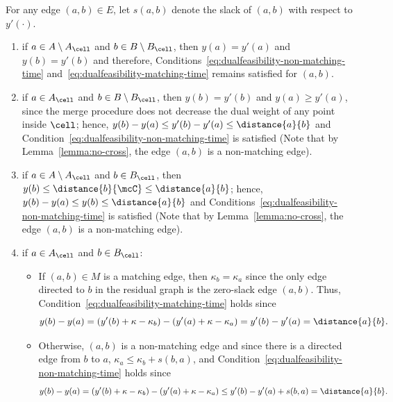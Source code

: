      For any edge $(a,b)\in E$, let $s(a,b)$ denote the slack of $(a,b)$ with respect to $y'(\cdot)$. 
    \begin{enumerate}
        \item if $a\in A\setminus A_\cell$ and $b\in B\setminus B_\cell$, then $y(a)=y'(a)$ and $y(b)=y'(b)$ and therefore, Conditions~\eqref{eq:dualfeasibility-non-matching-time} and~\eqref{eq:dualfeasibility-matching-time} remains satisfied for $(a,b)$.
        
        \item if $a\in A_\cell$ and $b\in B\setminus B_\cell$, then $y(b)=y'(b)$ and $y(a)\ge y'(a)$, since the merge procedure does not decrease the dual weight of any point inside $\cell$; hence, $y(b)-y(a)\le y'(b)-y'(a)\le \distance{a}{b}$ and Condition~\eqref{eq:dualfeasibility-non-matching-time} is satisfied (Note that by Lemma~\ref{lemma:no-cross}, the edge $(a,b)$ is a non-matching edge).

        \item if $a\in A\setminus A_\cell$ and $b\in B_\cell$, then $y(b)\le \distance{b}{\mcC}\le \distance{a}{b}$; hence, $y(b)-y(a)\le y(b)\le \distance{a}{b}$ and Conditions~\eqref{eq:dualfeasibility-non-matching-time} is satisfied (Note that by Lemma~\ref{lemma:no-cross}, the edge $(a,b)$ is a non-matching edge).

        \item if $a\in  A_\cell$ and $b\in B_\cell$: 
        \begin{itemize}
            \item If $(a,b)\in M$ is a matching edge, then $\kappa_b = \kappa_a$ since the only edge directed to $b$ in the residual graph is the zero-slack edge $(a,b)$. Thus, Condition~\eqref{eq:dualfeasibility-matching-time} holds since
            \begin{equation*}
            y(b) - y(a) = (y'(b)+\kappa-\kappa_b) - (y'(a)+\kappa-\kappa_a) = y'(b)-y'(a) = \distance{a}{b}.
            \end{equation*}
            \item Otherwise, $(a,b)$ is a non-matching edge and since there is a directed edge from $b$ to $a$, $\kappa_a\le \kappa_b + s(b,a)$, and Condition~\eqref{eq:dualfeasibility-non-matching-time} holds since
            \begin{equation}\label{eq:local-hung-1}
                y(b)-y(a) = (y'(b)+\kappa-\kappa_b) - (y'(a)+\kappa-\kappa_a) \le y'(b)-y'(a) + s(b,a) = \distance{a}{b}.
            \end{equation}
        \end{itemize}
    \end{enumerate}

